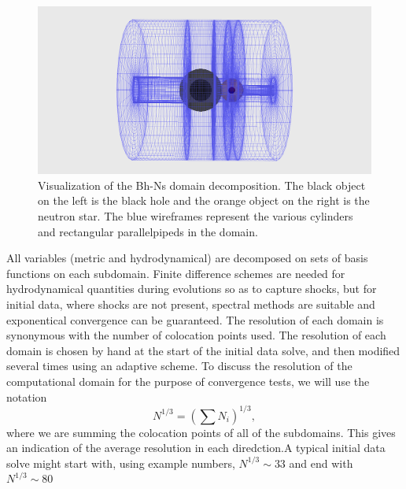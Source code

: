 \begin{center}
\begin{figure}[!ht]
\includegraphics[scale=0.45]{chap4/BhNsDomain.png}
\caption[Visualization of the Bh-Ns domain
decomposition.]{Visualization of the Bh-Ns domain decomposition. The
  black object on the left is the black hole and the orange object on
  the right is the neutron star. The blue wireframes represent the
  various cylinders and rectangular parallelpipeds in the
  domain. }
\label{fig:BhNsDomain}

\end{figure}
\end{center}

All variables (metric and hydrodynamical) are decomposed on sets of
basis functions on each subdomain. Finite difference schemes are
needed for hydrodynamical quantities during evolutions so as to
capture shocks, but for initial data, where shocks are not present, spectral methods are suitable and exponentical convergence can be guaranteed. The resolution of each domain is synonymous with the number of colocation points used. The resolution of each domain is chosen by hand at the start of the initial data solve, and then modified several times using an adaptive scheme. To discuss the resolution of the computational domain for the purpose of convergence tests, we will use the notation
\begin{equation}
N^{1/3}=\left(\sum N_i\right)^{1/3},
\end{equation}
where we are summing the colocation points of all of the
subdomains. This gives an indication of the average resolution in each
diredction.A typical initial data solve might start with, using example numbers, $N^{1/3}\sim 33$ and end with $N^{1/3}\sim 80$

